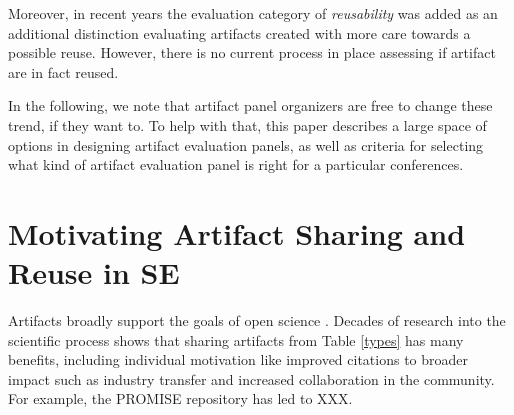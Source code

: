 \documentclass[smallextended]{svjour3}       %
\begin{document}

Moreover, in recent years the evaluation category of \emph{reusability} was added as an additional distinction evaluating artifacts created with more care towards a possible reuse. 
However, there is no current process in place assessing if artifact are in fact reused. 


In the following, we note that artifact panel organizers are free to change these trend, if they want to. 
To help with that, this paper describes a large space of options in designing artifact evaluation panels, as well as criteria for selecting what kind of artifact evaluation panel is right for a particular conferences.



\clearpage
\section{Motivating Artifact Sharing and Reuse in SE}
Artifacts broadly support the goals of open science \cite{Mendez2020}. Decades of research into the scientific process shows that sharing artifacts from Table \ref{types} has many benefits, including individual motivation like improved citations to broader impact such as industry transfer and increased collaboration in the community. For example, the PROMISE repository \cite{Sayyad2005} has led to XXX. 
\end{document}
